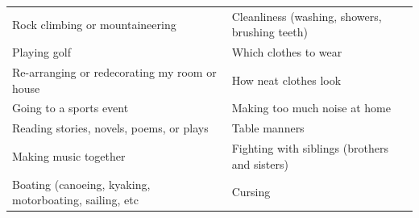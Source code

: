 \documentclass[
]{book}
\begin{document}
\begin{longtable}[]{@{}ll@{}}
\begin{minipage}[t]{0.50\columnwidth}\raggedright
Rock climbing or mountaineering\strut
\end{minipage} & \begin{minipage}[t]{0.44\columnwidth}\raggedright
Cleanliness (washing, showers, brushing teeth)\strut
\end{minipage}\tabularnewline
\begin{minipage}[t]{0.50\columnwidth}\raggedright
Playing golf\strut
\end{minipage} & \begin{minipage}[t]{0.44\columnwidth}\raggedright
Which clothes to wear\strut
\end{minipage}\tabularnewline
\begin{minipage}[t]{0.50\columnwidth}\raggedright
Re-arranging or redecorating my room or house\strut
\end{minipage} & \begin{minipage}[t]{0.44\columnwidth}\raggedright
How neat clothes look\strut
\end{minipage}\tabularnewline
\begin{minipage}[t]{0.50\columnwidth}\raggedright
Going to a sports event\strut
\end{minipage} & \begin{minipage}[t]{0.44\columnwidth}\raggedright
Making too much noise at home\strut
\end{minipage}\tabularnewline
\begin{minipage}[t]{0.50\columnwidth}\raggedright
Reading stories, novels, poems, or plays\strut
\end{minipage} & \begin{minipage}[t]{0.44\columnwidth}\raggedright
Table manners\strut
\end{minipage}\tabularnewline
\begin{minipage}[t]{0.50\columnwidth}\raggedright
Making music together\strut
\end{minipage} & \begin{minipage}[t]{0.44\columnwidth}\raggedright
Fighting with siblings (brothers and sisters)\strut
\end{minipage}\tabularnewline
\begin{minipage}[t]{0.50\columnwidth}\raggedright
Boating (canoeing, kyaking, motorboating, sailing, etc\strut
\end{minipage} & \begin{minipage}[t]{0.44\columnwidth}\raggedright
Cursing\strut
\end{minipage}\tabularnewline

\end{longtable}
\end{document}
